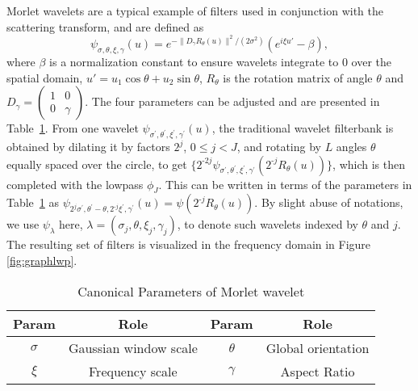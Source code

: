 \documentclass[10pt,twocolumn,letterpaper]{article}
\begin{document}
Morlet wavelets are a typical example of filters used in conjunction with the scattering transform, and are defined as
\vspace{-15pt}
\begin{equation}\label{eq:1}
    \psi_{\sigma, \theta, \xi, \gamma}(u) = e^{-\|D_{\gamma}R_{\theta}(u)\|^2/(2\sigma^2)}(e^{i\xi u'}-\beta),
\end{equation}
where $\beta$ is a normalization constant to ensure wavelets integrate to 0 over the spatial domain, $u' = u_1 \cos \theta + u_2 \sin \theta$, $R_{\theta}$ is the rotation matrix of angle $\theta$ and 
$
D_{\gamma} = \begin{pmatrix}
1 & 0 \\
0 & \gamma
\end{pmatrix}
.
$
The four parameters can be adjusted and are presented in Table~\ref{tab:params}. 
From one wavelet $\psi_{\sigma^\prime, \theta^\prime, \xi^\prime, \gamma^\prime}(u)$, the traditional wavelet filterbank is obtained by dilating it by factors $2^j$, $0\leq j < J$, and rotating by $L$ angles $\theta$ equally spaced over the circle, to get $\{2^{\textrm{-}2j} \psi_{\sigma^\prime, \theta^\prime, \xi^\prime, \gamma^\prime}(2^{\textrm{-}j}R_{\theta}(u))\}$, which is then completed with the lowpass $\phi_J$.  This can be written in terms of the parameters in Table~\ref{tab:params} as $\psi_{2^{j} \sigma^\prime, \theta^\prime - \theta, 2^{\textrm{-}j}\xi^\prime, \gamma^\prime}(u) = \psi(2^{\textrm{-}j}R_{\theta}(u))$. By slight abuse of notations, we use $\psi_\lambda$ here, $\lambda = (\sigma_j, \theta, \xi_j, \gamma_j)$, to denote such wavelets indexed by $\theta$ and $j$. The resulting set of filters is visualized in the frequency domain in Figure \ref{fig:graphlwp}. 

\begin{table}[tb]
\centering
\small
\caption{Canonical Parameters of Morlet wavelet\vspace{-5pt}}
    \begin{tabular}{|c|c||c|c|}
     \hline Param  &  Role &  Param  &  Role\\\hline
$\sigma$   & Gaussian window scale & 
      $\theta$   & Global orientation \\
      \hline $\xi$   & Frequency scale & 
      $\gamma$   & Aspect Ratio \\
      \hline \end{tabular}
    \label{tab:params}
\vspace{-15pt}
\end{table}
\end{document}
